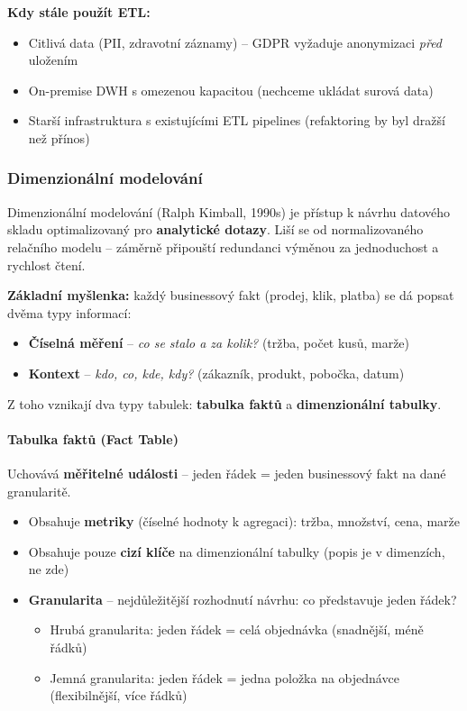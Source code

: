 \textbf{Kdy stále použít ETL:}
\begin{itemize}
  \item Citlivá data (PII, zdravotní záznamy) -- GDPR vyžaduje anonymizaci \textit{před} uložením
  \item On-premise DWH s omezenou kapacitou (nechceme ukládat surová data)
  \item Starší infrastruktura s existujícími ETL pipelines (refaktoring by byl dražší než přínos)
\end{itemize}

\subsubsection{Dimenzionální modelování}

Dimenzionální modelování (Ralph Kimball, 1990s) je přístup k návrhu datového skladu optimalizovaný
pro \textbf{analytické dotazy}. Liší se od normalizovaného relačního modelu -- záměrně připouští
redundanci výměnou za jednoduchost a rychlost čtení.

\textbf{Základní myšlenka:} každý businessový fakt (prodej, klik, platba) se dá popsat dvěma typy informací:
\begin{itemize}
  \item \textbf{Číselná měření} -- \textit{co se stalo a za kolik?} (tržba, počet kusů, marže)
  \item \textbf{Kontext} -- \textit{kdo, co, kde, kdy?} (zákazník, produkt, pobočka, datum)
\end{itemize}
Z toho vznikají dva typy tabulek: \textbf{tabulka faktů} a \textbf{dimenzionální tabulky}.

\paragraph{Tabulka faktů (Fact Table)}
Uchovává \textbf{měřitelné události} -- jeden řádek = jeden businessový fakt na dané granularitě.

\begin{itemize}
  \item Obsahuje \textbf{metriky} (číselné hodnoty k agregaci): tržba, množství, cena, marže
  \item Obsahuje pouze \textbf{cizí klíče} na dimenzionální tabulky (popis je v dimenzích, ne zde)
  \item \textbf{Granularita} -- nejdůležitější rozhodnutí návrhu: co představuje jeden řádek?
    \begin{itemize}
      \item Hrubá granularita: jeden řádek = celá objednávka (snadnější, méně řádků)
      \item Jemná granularita: jeden řádek = jedna položka na objednávce (flexibilnější, více řádků)
    \end{itemize}
\end{itemize}


